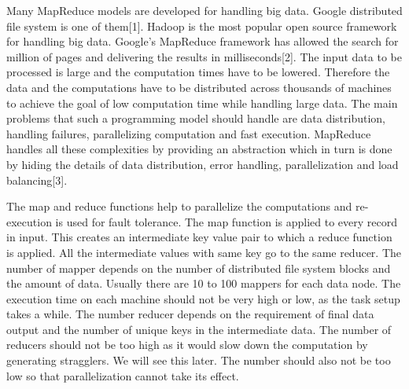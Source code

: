 \documentclass[sigconf]{acmart}
\begin{document}
\par Many MapReduce models are developed for handling big data. Google distributed file system is one of them[1]. Hadoop is the most popular open source framework for handling big data. Google's MapReduce framework has allowed the search for million of pages and delivering the results in milliseconds[2]. The input data to be processed is large and the computation times have to be lowered. Therefore the data and the computations have to be distributed across thousands of machines to achieve the goal of low computation time while handling large data. The main problems that such a programming model should handle are data distribution, handling failures, parallelizing computation and fast execution. MapReduce handles all these complexities by providing an abstraction which in turn is done by hiding the details of data distribution, error handling, parallelization and load balancing[3]. 
\par The map and reduce functions help to parallelize the computations and re-execution is used for fault tolerance. The map function is applied to every record in input. This creates an intermediate key value pair to which a reduce function is applied. All the intermediate values with same key go to the same reducer. The number of mapper depends on the number of distributed file system blocks and the amount of data. Usually there are 10 to 100 mappers for each data node. The execution time on each machine should not be very high or low, as the task setup takes a while. The number reducer depends on the requirement of final data output and the number of unique keys in the intermediate data. The number of reducers should not be too high as it would slow down the computation by generating stragglers. We will see this later. The number should also not be too low so that parallelization cannot take its effect. 
\end{document}
